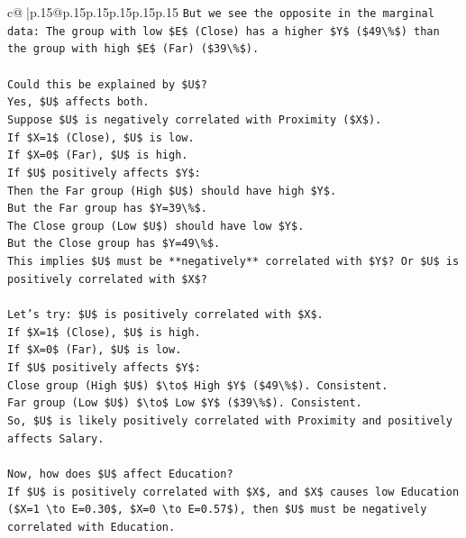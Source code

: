 \documentclass{article}
\begin{document}
{\begin{supertabular}{c@{$\;$}|p{.15\linewidth}@{}p{.15\linewidth}p{.15\linewidth}p{.15\linewidth}p{.15\linewidth}p{.15\linewidth}}
{{{\texttt{But we see the opposite in the marginal data: The group with low \$E\$ (Close) has a higher \$Y\$ (\$49\textbackslash{}\%\$) than the group with high \$E\$ (Far) (\$39\textbackslash{}\%\$).} \\
\\ 
\texttt{Could this be explained by \$U\$?} \\
\texttt{Yes, \$U\$ affects both.} \\
\texttt{Suppose \$U\$ is negatively correlated with Proximity (\$X\$).} \\
\texttt{If \$X=1\$ (Close), \$U\$ is low.} \\
\texttt{If \$X=0\$ (Far), \$U\$ is high.} \\
\texttt{If \$U\$ positively affects \$Y\$:} \\
\texttt{Then the Far group (High \$U\$) should have high \$Y\$.} \\
\texttt{But the Far group has \$Y=39\textbackslash{}\%\$.} \\
\texttt{The Close group (Low \$U\$) should have low \$Y\$.} \\
\texttt{But the Close group has \$Y=49\textbackslash{}\%\$.} \\
\texttt{This implies \$U\$ must be **negatively** correlated with \$Y\$? Or \$U\$ is positively correlated with \$X\$?} \\
\\ 
\texttt{Let's try: \$U\$ is positively correlated with \$X\$.} \\
\texttt{If \$X=1\$ (Close), \$U\$ is high.} \\
\texttt{If \$X=0\$ (Far), \$U\$ is low.} \\
\texttt{If \$U\$ positively affects \$Y\$:} \\
\texttt{Close group (High \$U\$) \$\textbackslash{}to\$ High \$Y\$ (\$49\textbackslash{}\%\$). Consistent.} \\
\texttt{Far group (Low \$U\$) \$\textbackslash{}to\$ Low \$Y\$ (\$39\textbackslash{}\%\$). Consistent.} \\
\texttt{So, \$U\$ is likely positively correlated with Proximity and positively affects Salary.} \\
\\ 
\texttt{Now, how does \$U\$ affect Education?} \\
\texttt{If \$U\$ is positively correlated with \$X\$, and \$X\$ causes low Education (\$X=1 \textbackslash{}to E=0.30\$, \$X=0 \textbackslash{}to E=0.57\$), then \$U\$ must be negatively correlated with Education.} \\
}}}
\end{supertabular}}
\end{document}

